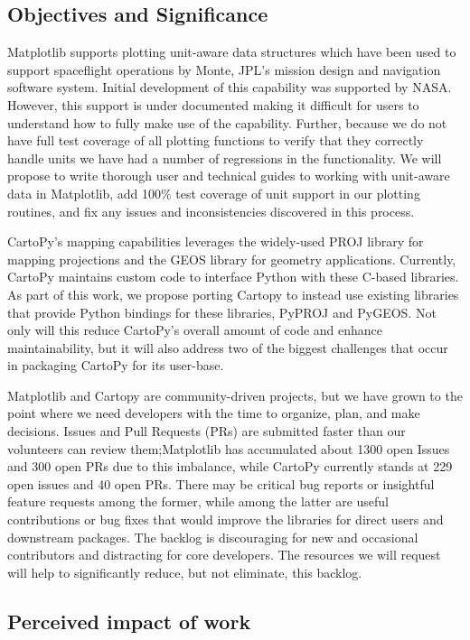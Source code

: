 \documentclass[12pt]{article}
\numberwithin{page}{section}
\begin{document}
\subsection{Objectives and Significance}
Matplotlib supports plotting unit-aware data structures which have
been used to support spaceflight operations by Monte, JPL's mission
design and navigation software system. Initial development of this
capability was supported by NASA. However, this support is under
documented making it difficult for users to understand how to fully
make use of the capability. Further, because we do not have full test
coverage of all plotting functions to verify that they correctly
handle units we have had a number of regressions in the
functionality. We will propose to write thorough user and technical
guides to working with unit-aware data in Matplotlib, add 100\% test
coverage of unit support in our plotting routines, and fix any issues
and inconsistencies discovered in this process.

CartoPy's mapping capabilities leverages the widely-used PROJ library
for mapping projections and the GEOS library for geometry
applications. Currently, CartoPy maintains custom code to interface
Python with these C-based libraries. As part of this work, we propose
porting Cartopy to instead use existing libraries that provide Python
bindings for these libraries, PyPROJ and PyGEOS. Not only will this
reduce CartoPy's overall amount of code and enhance maintainability,
but it will also address two of the biggest challenges that occur in
packaging CartoPy for its user-base.


Matplotlib and Cartopy are community-driven projects, but we have
grown to the point where we need developers with the time to organize,
plan, and make decisions. Issues and Pull Requests (PRs) are submitted
faster than our volunteers can review them;Matplotlib has accumulated
about 1300 open Issues and 300 open PRs due to this imbalance, while
CartoPy currently stands at 229 open issues and 40 open PRs. There may
be critical bug reports or insightful feature requests among the
former, while among the latter are useful contributions or bug fixes
that would improve the libraries for direct users and downstream
packages. The backlog is discouraging for new and occasional
contributors and distracting for core developers. The resources we
will request will help to significantly reduce, but not eliminate,
this backlog.

\subsection{Perceived impact of work}
\end{document}
